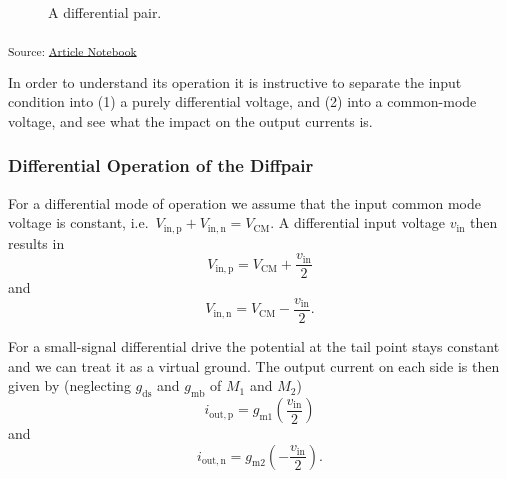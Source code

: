 \documentclass[
  a4paper,
  DIV=11,
  numbers=noendperiod]{scrartcl}
\begin{document}
\begin{figure}[H]


\caption{\label{fig-differential-pair}A differential pair.}

\end{figure}%

\textsubscript{Source:
\href{https://iic-jku.github.io/analog-circuit-design/index.qmd.html}{Article
Notebook}}

In order to understand its operation it is instructive to separate the
input condition into (1) a purely differential voltage, and (2) into a
common-mode voltage, and see what the impact on the output currents is.

\subsubsection{Differential Operation of the
Diffpair}\label{differential-operation-of-the-diffpair}

For a differential mode of operation we assume that the input common
mode voltage is constant,
i.e.~\(V_\mathrm{in,p} + V_\mathrm{in,n} = V_\mathrm{CM}\). A
differential input voltage \(v_\mathrm{in}\) then results in \[
V_\mathrm{in,p} = V_\mathrm{CM} + \frac{v_\mathrm{in}}{2}
\] and \[
V_\mathrm{in,n} = V_\mathrm{CM} - \frac{v_\mathrm{in}}{2}.
\]

For a small-signal differential drive the potential at the tail point
stays constant and we can treat it as a virtual ground. The output
current on each side is then given by (neglecting \(g_\mathrm{ds}\) and
\(g_\mathrm{mb}\) of \(M_1\) and \(M_2\)) \[
i_\mathrm{out,p} = g_\mathrm{m1} \left( \frac{v_\mathrm{in}}{2} \right)
\] and \[
i_\mathrm{out,n} = g_\mathrm{m2} \left( -\frac{v_\mathrm{in}}{2} \right).
\]
\end{document}
